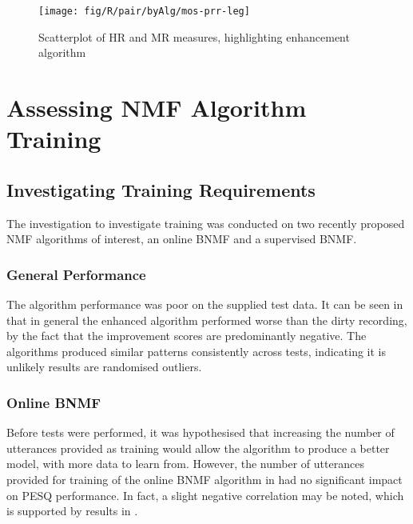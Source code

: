 \begin{figure}[h]

\noindent \begin{centering}
\texttt{[image: fig/R/pair/byAlg/mos-prr-leg]}
\par\end{centering}

\protect\caption{\label{fig:hr-mr-alg}Scatterplot of \acs{HR} and \acs{MR} measures,
highlighting enhancement algorithm}
\end{figure}


\clearpage{}


\section{Assessing \acl{NMF} Algorithm Training}


\subsection{Investigating Training Requirements}

The investigation to investigate training was conducted on two recently
proposed \ac{NMF} algorithms of interest, an online \ac{BNMF} and
a supervised \ac{BNMF}.


\subsubsection*{General Performance}

The algorithm performance was poor on the supplied test data. It can
be seen in  that in general the enhanced
algorithm performed worse than the dirty recording, by the fact that
the improvement scores are predominantly negative. The algorithms
produced similar patterns consistently across tests, indicating it
is unlikely results are randomised outliers.


\subsubsection*{Online \acl{BNMF}}

Before tests were performed, it was hypothesised that increasing the
number of utterances provided as training would allow the algorithm
to produce a better model, with more data to learn from. However,
the number of utterances provided for training of the online \ac{BNMF}
algorithm in  had no significant impact on
\ac{PESQ} performance. In fact, a slight negative correlation may
be noted, which is supported by results in .
